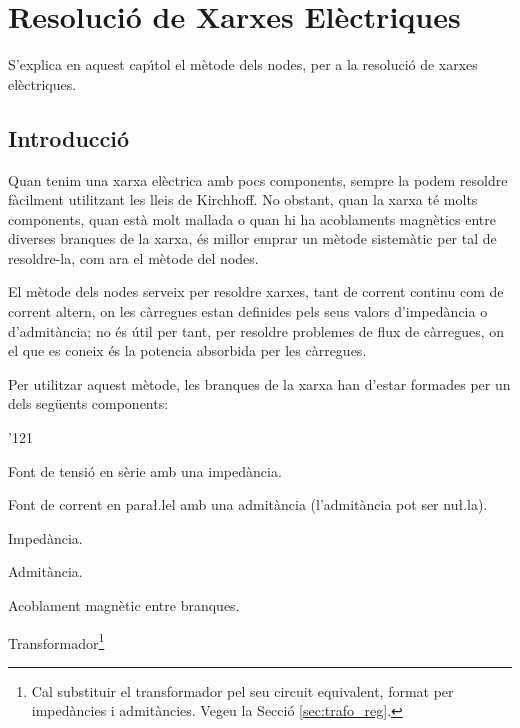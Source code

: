 \chapter{Resoluci\'{o} de Xarxes El\`{e}ctriques} \label{chap:nusos}

S'explica en aquest cap\'{\i}tol el m\`{e}tode dels
nodes, per a la resoluci\'{o} de xarxes el\`{e}ctriques.

\section{Introducci\'{o}}

Quan tenim una xarxa el\`{e}ctrica amb pocs components, sempre la podem resoldre f\`{a}cilment
utilitzant les lleis de Kirchhoff. No obstant, quan la xarxa t\'{e} molts components, quan est\`{a}
 molt mallada o quan hi ha acoblaments magn\`{e}tics entre diverses branques de la xarxa, \'{e}s millor
 emprar un m\`{e}tode sistem\`{a}tic per tal de resoldre-la, com ara el m\`{e}tode del nodes.

El m\`{e}tode dels nodes serveix per resoldre xarxes, tant de corrent continu com de corrent altern, on
les c\`{a}rregues estan definides pels seus valors d'imped\`{a}ncia o d'admit\`{a}ncia; no \'{e}s \'{u}til per tant, per
resoldre problemes de flux de c\`{a}rregues, on el que es coneix \'{e}s la potencia absorbida per les
c\`{a}rregues.

Per utilitzar aquest m\`{e}tode, les branques de la xarxa han d'estar
formades per un dels seg\"{u}ents components: \vspace{-1.5mm}
\begin{dinglist}{'121}
   \item Font de tensi\'{o} en s\`{e}rie amb una imped\`{a}ncia.
   \item Font de corrent en para{\l.l}el amb una admit\`{a}ncia (l'admit\`{a}ncia pot ser nu{\l.l}a).
   \item Imped\`{a}ncia.
   \item Admit\`{a}ncia.
   \item Acoblament magn\`{e}tic entre branques.
   \item Transformador\footnote{Cal substituir el transformador pel seu circuit equivalent, format per imped\`{a}ncies i
   admit\`{a}ncies. Vegeu la Secci\'{o} \ref{sec:trafo_reg}.}
\end{dinglist}
\vspace{-1.5mm}

